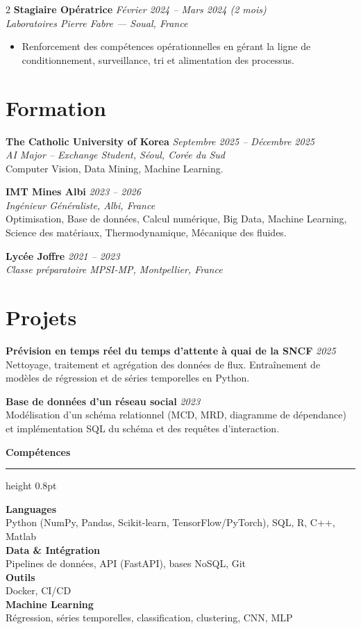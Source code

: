 \documentclass[10.5pt,a4paper]{article}
\newcommand{\sectionrule}{\vspace{-6pt}{\color{accent}\hrule height 1pt}\vspace{3pt}}
\newcommand{\subsectitle}[1]{%
  {\color{accent}\bfseries\large #1}\\[-2pt]
  {\color{accent}\hrule height 0.8pt}\vspace{4pt}
}
\newcommand{\cvexp}[5]{%
  \noindent\textbf{#1} \hfill {\itshape\color{graytext}\small #4}\\
  {\itshape #2 --- #3}\\[-2pt]
  #5
  \vspace{10pt}
}
\newcommand{\cvedu}[5]{%
  \noindent\textbf{#1} \hfill {\itshape\color{graytext}\small #4}\\
  {\itshape #2, #3}\\[1pt]
  {\small #5}
  \vspace{2pt}
}
\newcommand{\cveduplain}[4]{%
  \noindent\textbf{#1} \hfill {\itshape\color{graytext}\small #4}\\
  {\itshape #2, #3}
  \vspace{2pt}
}
\newcommand{\cvproject}[3]{%
  \noindent\textbf{#1} \hfill {\itshape\color{graytext}\small #2}\\[1pt]
  {\small #3}
  \vspace{3pt}
}
\newcommand{\sidebarline}[2]{%
  \noindent\textbf{\small #1}\\
  {\small #2}\\[3pt]
}
\begin{document}
\begin{paracol}{2}
\cvexp{Stagiaire Opératrice}{Laboratoires Pierre Fabre}{Soual, France}{Février 2024 -- Mars 2024 (2 mois)}{%
  \begin{itemize}[leftmargin=12pt, itemsep=2pt, topsep=0pt, partopsep=0pt, parsep=0pt]
    \item Renforcement des compétences opérationnelles en gérant la ligne de conditionnement, surveillance, tri et alimentation des processus.
  \end{itemize}
}

\section*{Formation}
\sectionrule

\cvedu{The Catholic University of Korea}{AI Major -- Exchange Student}{Séoul, Corée du Sud}{Septembre 2025 -- Décembre 2025}{Computer Vision, Data Mining, Machine Learning.}

\cvedu{IMT Mines Albi}{Ingénieur Généraliste}{Albi, France}{2023 -- 2026}{Optimisation, Base de données, Calcul numérique, Big Data, Machine Learning, Science des matériaux, Thermodynamique, Mécanique des fluides.}

\cveduplain{Lycée Joffre}{Classe préparatoire MPSI-MP}{Montpellier, France}{2021 -- 2023}

\section*{Projets}
\sectionrule

\cvproject{Prévision en temps réel du temps d'attente à quai de la SNCF}{2025}{Nettoyage, traitement et agrégation des données de flux. Entraînement de modèles de régression et de séries temporelles en Python.}

\cvproject{Base de données d'un réseau social}{2023}{Modélisation d'un schéma relationnel (MCD, MRD, diagramme de dépendance) et implémentation SQL du schéma et des requêtes d'interaction.}

\switchcolumn

\vspace{2pt}

\subsectitle{Compétences}

\sidebarline{Languages}{Python (NumPy, Pandas, Scikit-learn, TensorFlow/\allowbreak PyTorch), SQL, R, C++, Matlab}
\sidebarline{Data \& Intégration}{Pipelines de données, API (FastAPI), bases NoSQL, Git}
\sidebarline{Outils}{Docker, CI/CD}
\sidebarline{Machine Learning}{Régression, séries temporelles, classification, clustering, CNN, MLP}


\end{paracol}
\end{document}
